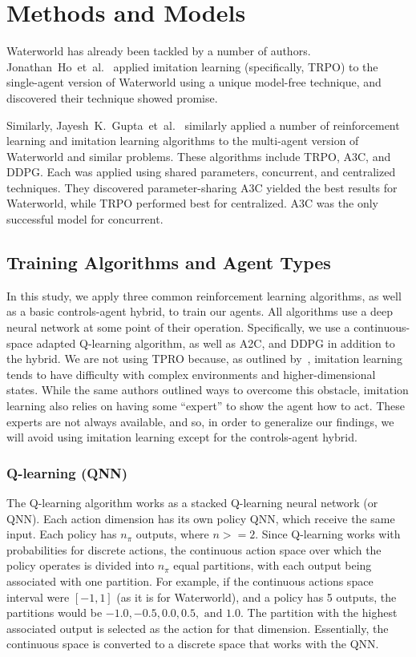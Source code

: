 \section{Methods and Models}\label{sec:methods}
Waterworld has already been tackled by a number of authors.
Jonathan~Ho~et~al.~\cite{Ho2016} applied imitation learning (specifically, TRPO) to the
single-agent version of Waterworld using a unique model-free technique, and discovered
their technique showed promise.

Similarly, Jayesh~K.~Gupta~et~al.~\cite{Gupta2017} similarly applied a number of
reinforcement learning and imitation learning algorithms to the multi-agent version
of Waterworld and similar problems.
These algorithms include TRPO, A3C, and DDPG\@.
Each was applied using shared parameters, concurrent, and centralized techniques.
They discovered parameter-sharing A3C yielded the best results for Waterworld, while
TRPO performed best for centralized.
A3C was the only successful model for concurrent.

\subsection{Training Algorithms and Agent Types}\label{subsec:training-algorithms}
In this study, we apply three common reinforcement learning algorithms, as well as a
basic controls-agent hybrid, to train our agents.
All algorithms use a deep neural network at some point of their operation.
Specifically, we use a continuous-space adapted Q-learning algorithm, as well as A2C,
and DDPG in addition to the hybrid.
We are not using TPRO because, as outlined by~\cite{Ho2016}, imitation learning tends
to have difficulty with complex environments and higher-dimensional states.
While the same authors outlined ways to overcome this obstacle, imitation learning
also relies on having some ``expert'' to show the agent how to act.
These experts are not always available, and so, in order to generalize our findings,
we will avoid using imitation learning except for the controls-agent hybrid.

\subsubsection{Q-learning (QNN)}
The Q-learning algorithm works as a stacked Q-learning neural network (or QNN).
Each action dimension has its own policy QNN, which receive the same input.
Each policy has $n_\pi$ outputs, where $n >= 2$.
Since Q-learning works with probabilities for discrete actions, the continuous
action space over which the policy operates is divided into $n_\pi$ equal partitions,
with each output being associated with one partition.
For example, if the continuous actions space interval were $[-1, 1]$ (as it is for
Waterworld), and a policy has 5 outputs, the partitions would be $-1.0, -0.5, 0.0, 0.5,
\text{ and } 1.0$.
The partition with the highest associated output is selected as the action for that
dimension.
Essentially, the continuous space is converted to a discrete space that works with
the QNN\@.

